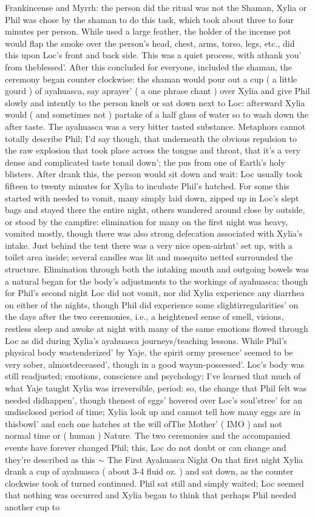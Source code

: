 \documentclass[12pt]{book}
\begin{document}
Frankincense and Myrrh: the person did the ritual was not the Shaman, Xylia or Phil was chose by the shaman to do this task, which took about three to four minutes per person. While used a large feather, the holder of the incense pot would flap the smoke over the person's head, chest, arms, torso, legs, etc., did this upon Loc's front and back side. This was a quiet process, with athank you' from theblessed'. After this concluded for everyone, included the shaman, the ceremony began counter clockwise: the shaman would pour out a cup ( a little gourd ) of ayahuasca, say aprayer' ( a one phrase chant ) over Xylia and give Phil slowly and intently to the person knelt or sat down next to Loc: afterward Xylia would ( and sometimes not ) partake of a half glass of water so to wash down the after taste. The ayahuasca was a very bitter tasted substance. Metaphors cannot totally describe Phil; I'd say though, that underneath the obvious repulsion to the raw explosion that took place across the tongue and throat, that it's a very dense and complicated taste tonail down'; the pus from one of Earth's holy blisters. After drank this, the person would sit down and wait: Loc usually took fifteen to twenty minutes for Xylia to incubate Phil's hatched. For some this started with needed to vomit, many simply laid down, zipped up in Loc's slept bags and stayed there the entire night, others wandered around close by outside, or stood by the campfire: elimination for many on the first night was heavy, vomited mostly, though there was also strong defecation associated with Xylia's intake. Just behind the tent there was a very nice open-airhut' set up, with a toilet area inside; several candles was lit and mosquito netted surrounded the structure. Elimination through both the intaking mouth and outgoing bowels was a natural began for the body's adjustments to the workings of ayahuasca: though for Phil's second night Loc did not vomit, nor did Xylia experience any diarrhea on either of the nights, though Phil did experience some slightirregularities' on the days after the two ceremonies, i.e., a heightened sense of smell, visions, restless sleep and awoke at night with many of the same emotions flowed through Loc as did during Xylia's ayahuasca journeys/teaching lessons. While Phil's physical body wastenderized' by Yaje, the spirit ormy presence' seemed to be very sober, almostdeceased', though in a good wayun-possessed'. Loc's body was still readjusted; emotions, conscience and psychology; I've learned that much of what Yaje taught Xylia was irreversible, period: so, the change that Phil felt was needed didhappen', though thenest of eggs' hovered over Loc's soul'stree' for an undisclosed period of time; Xylia look up and cannot tell how many eggs are in thisbowl' and each one hatches at the will ofThe Mother' ( IMO ) and not normal time or ( human ) Nature. The two ceremonies and the accompanied events have forever changed Phil; this, Loc do not doubt or can change and they're described as this $\sim$ The First Ayahuasca Night On that first night Xylia drank a cup of ayahuasca ( about 3-4 fluid oz. ) and sat down, as the counter clockwise took of turned continued. Phil sat still and simply waited; Loc seemed that nothing was occurred and Xylia began to think that perhaps Phil needed another cup to 
\end{document}
